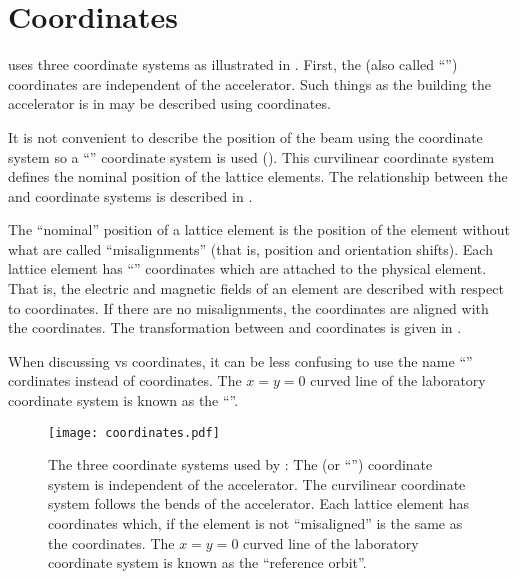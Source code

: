 \chapter{Coordinates}
\label{s:coords.3}

\vspace*{-0.3in}
\bmad uses three coordinate systems as illustrated in . First, the  (also
called ``'') coordinates are independent of the accelerator. Such things as the
building the accelerator is in may be described using  coordinates.

It is not convenient to describe the position of the beam using the  coordinate system so
a ``'' coordinate system is used ().  This curvilinear coordinate
system defines the nominal position of the lattice elements.  The relationship between the
 and  coordinate systems is described in .

The ``nominal'' position of a lattice element is the position of the element without what are called
``misalignments'' (that is, position and orientation shifts). Each lattice element has ``'' coordinates which are attached to the physical element. That is, the electric and magnetic
fields of an element are described with respect to  coordinates.  If there are no
misalignments, the  coordinates are aligned with the  coordinates. The
transformation between  and  coordinates is given in
.

When discussing  vs  coordinates, it can be less confusing to use the name
``'' cordinates instead of  coordinates. The $x=y=0$ curved line of the
laboratory coordinate system is known as the ``''.

\begin{figure}[!b]
  \centering
  \texttt{[image: coordinates.pdf]}
  \caption[The three coordinate system used by \bmad.]
{The three coordinate systems used by \bmad: The  (or ``'') coordinate system
is independent of the accelerator.  The  curvilinear coordinate system follows the bends
of the accelerator.  Each lattice element has  coordinates which, if the element is
not ``misaligned'' is the same as the  coordinates. The $x=y=0$ curved line of the
laboratory coordinate system is known as the ``reference orbit''.}
  \label{f:coords}
\end{figure}

